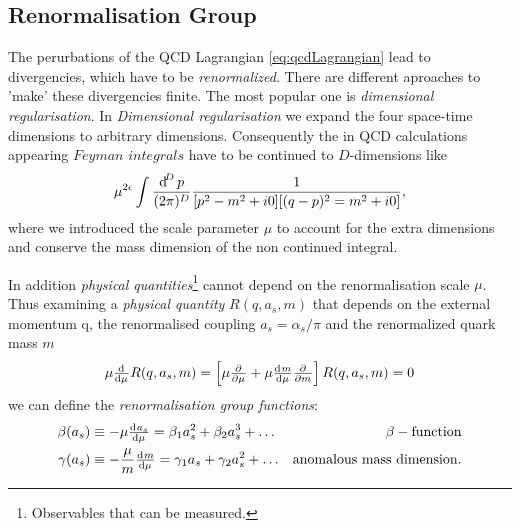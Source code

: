\documentclass[../../index.tex]{subfiles}
\begin{document}
\subsection{Renormalisation Group}
The perurbations of the QCD Lagrangian \ref{eq:qcdLagrangian} lead to divergencies, which have to be
\textit{renormalized}. There are different aproaches to 'make' these
divergencies finite. The most popular one is \textit{dimensional
  regularisation}.
In \textit{Dimensional regularisation} we expand the four space-time dimensions
to arbitrary dimensions. Consequently the in QCD calculations appearing
$\textit{Feyman integrals}$ have to be continued to $D$-dimensions like
\begin{equation}
  \label{eq:dimRegFeynmanIntegral}
  \mu^{2\epsilon} \int \frac{\dif^D p}{(2\pi)^D}\frac{1}{[p^2-m^2+i0][(q-p)^2=m^2+i0]},
\end{equation}
where we introduced the scale parameter $\mu$ to account for the extra
dimensions and conserve the mass dimension of the non continued integral.

In addition \textit{physical quantities}\footnote{Observables that can be
  measured.} cannot depend on the renormalisation scale $\mu$. Thus examining a \textit{physical quantity} $R(q, a_s, m)$ that depends on the
external momentum q, the renormalised coupling $a_s=\alpha_s/\pi$ and the renormalized quark mass $m$ 
\begin{equation}
  \mu \od{}{\mu}R(q, a_s, m) = \left[ \mu \pd{}{\mu} + \mu \od{m}{\mu} \pd{}{m} \right] R(q, a_s, m) = 0
\end{equation}
we can define the \textit{renormalisation group functions}:
\begin{align}
  \beta(a_s) &\equiv -\mu \od{a_s}{\mu} = \beta_1 a_s^2 + \beta_2 a_s^3 + \dots & \beta-\text{function}
  \label{eq:betaFunction} \\
  \gamma(a_s) &\equiv - \frac{\mu}{m} \od{m}{\mu} = \gamma_1 a_s + \gamma_2 a_s^2 + \dots & \text{anomalous mass dimension}.
  \label{eq:anomalousMassDimension}
\end{align}
\end{document}

